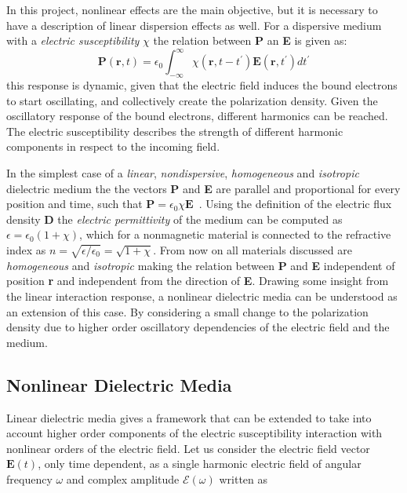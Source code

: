 In this project, nonlinear effects are the main objective, but it is necessary to have a description of linear dispersion effects as well. For a dispersive medium with a \emph{electric susceptibility }$\chi$  the relation between \textbf{P} an \textbf{E} is given as\cite{FiberAgrawal}:
\begin{equation}
\textbf{P}(\textbf{r},t)=\epsilon_0 \int^{\infty}_{-\infty} \chi(\textbf{r},t-t^\prime)\textbf{E}(\textbf{r},t^\prime)dt^\prime
\end{equation}
this response is dynamic, given that the electric field induces the bound electrons to start oscillating, and collectively create the polarization density. Given the oscillatory  response of the bound electrons, different harmonics can be reached. The electric susceptibility describes the strength of different harmonic components in respect to the incoming field.


In the simplest case of a \emph{linear}, \emph{nondispersive}, \emph{homogeneous} and \emph{isotropic} dielectric medium the the vectors \textbf{P} and \textbf{E} are parallel and proportional for every position and time, such that $\textbf{P}=\epsilon_0\chi\textbf{E}$~\cite{FundPhoto,FiberAgrawal}. Using the definition of the electric flux density \textbf{D} the \emph{electric permittivity} of the medium can be computed as $\epsilon=\epsilon_0(1+\chi)$, which for a nonmagnetic material is connected to the refractive index as $n=\sqrt{\epsilon/\epsilon_0}=\sqrt{1+\chi}$. From now on all materials discussed are \emph{homogeneous} and \emph{isotropic} making the relation between \textbf{P} and \textbf{E} independent of position \textbf{r} and independent from the direction of  \textbf{E}. Drawing some insight from the linear interaction response, a nonlinear dielectric media can be understood as an extension of this case. By considering a small change to the polarization density due to higher order oscillatory dependencies of the electric field and the medium. 


\subsection{ Nonlinear Dielectric Media}\label{sec:NLDM}

 Linear dielectric media gives a framework that can be extended to take into account higher order components of the electric susceptibility interaction with nonlinear orders of the electric field.  Let us consider the electric field vector $\textbf{E}(t)$, only time dependent, as a single harmonic electric field of angular frequency $\omega$ and complex amplitude $\mathcal{E}(\omega)$ written as~\cite{FundPhoto} 
 
